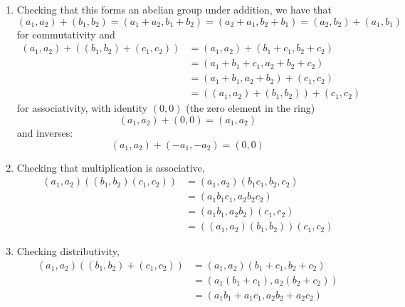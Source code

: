 \documentclass[12pt,letterpaper]{article}
\theoremstyle{definition}
\begin{document}
\begin{enumerate}
  \item Checking that this forms an abelian group under addition, we have that
        \[
        (a_{1}, a_{2}) + (b_{1}, b_{2}) = (a_{1} + a_{2}, b_{1} + b_{2}) = (a_{2} + a_{1}, b_{2} + b_{1}) = (a_{2}, b_{2}) + (a_{1}, b_{1})
        \]
        for commutativity and
        \begin{align*}
          (a_{1}, a_{2}) + ((b_{1}, b_{2}) + (c_{1}, c_{2})) &= (a_{1}, a_{2}) + (b_{1} + c_{1}, b_{2} + c_{2}) \\
                                                             &= (a_{1} + b_{1} + c_{1}, a_{2} + b_{2} + c_{2}) \\
                                                             &= (a_{1} + b_{1}, a_{2} + b_{2}) + (c_{1}, c_{2}) \\
                                                             &= ((a_{1}, a_{2}) + (b_{1}, b_{2})) + (c_{1}, c_{2})
        \end{align*}
        for associativity, with identity $(0, 0)$ (the zero element in the ring)
        \[
        (a_{1}, a_{2}) + (0, 0) = (a_{1}, a_{2})
        \]
        and inverses:
        \[
        (a_{1}, a_{2}) + (-a_{1}, -a_{2}) = (0, 0)
        \]
  \item Checking that multiplication is associative,
        \begin{align*}
          (a_{1},a_{2})((b_{1},b_{2})(c_{1},c_{2})) &= (a_{1},a_{2})(b_{1}c_{1}, b_{2},c_{2}) \\
                                                    &= (a_{1}b_{1}c_{1}, a_{2}b_{2}c_{2}) \\
                                                    &= (a_{1}b_{1}, a_{2}b_{2})(c_{1},c_{2}) \\
                                                    &= ((a_{1},a_{2})(b_{1},b_{2}))(c_{1},c_{2})
        \end{align*}
  \item Checking distributivity,
        \begin{align*}
          (a_{1},a_{2})((b_{1}, b_{2}) + (c_{1}, c_{2})) &= (a_{1},a_{2})(b_{1} + c_{1}, b_{2} + c_{2}) \\
                                                         &= (a_{1}(b_{1} + c_{1}), a_{2}(b_{2} + c_{2})) \\
                                                         &= (a_{1}b_{1} + a_{1}c_{1}, a_{2}b_{2} + a_{2}c_{2}) \\

\end{align*}
\end{enumerate}
\end{document}
